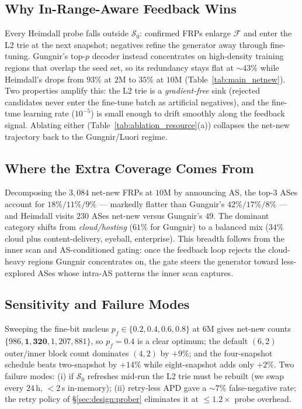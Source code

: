 \documentclass[conference]{IEEEtran}
\begin{document}
\subsection{Why In-Range-Aware Feedback Wins}
Every Heimdall probe falls outside $\mathcal{S}_{0}$: confirmed
FRPs enlarge $\mathcal{F}$ and enter the L2 trie at the next
snapshot; negatives refine the generator away through fine-tuning.
Gungnir's top-$p$ decoder instead concentrates on high-density
training regions that overlap the seed set, so its redundancy
stays flat at $\sim\!43\%$ while Heimdall's drops from $93\%$ at
$2$M to $35\%$ at $10$M (Table~\ref{tab:main_netnew}).  Two
properties amplify this: the L2 trie is a \emph{gradient-free}
sink (rejected candidates never enter the fine-tune batch as
artificial negatives), and the fine-tune learning rate
($10^{-5}$) is small enough to drift smoothly along the feedback
signal.  Ablating either (Table~\ref{tab:ablation_resource}(a))
collapses the net-new trajectory back to the Gungnir/Luori regime.

\subsection{Where the Extra Coverage Comes From}
Decomposing the $3{,}084$ net-new FRPs at $10$M by announcing AS,
the top-$3$ ASes account for $18\%/11\%/9\%$ --- markedly flatter
than Gungnir's $42\%/17\%/8\%$ --- and Heimdall visits $230$ ASes
net-new versus Gungnir's $49$.  The dominant category shifts
from \emph{cloud/hosting} ($61\%$ for Gungnir) to a balanced mix
($34\%$ cloud plus content-delivery, eyeball, enterprise).  This
breadth follows from the inner scan and AS-conditioned gating:
once the feedback loop rejects the cloud-heavy regions Gungnir
concentrates on, the gate steers the generator toward
less-explored ASes whose intra-AS patterns the inner scan captures.

\subsection{Sensitivity and Failure Modes}
Sweeping the fine-bit nucleus $p_f\!\in\!\{0.2,0.4,0.6,0.8\}$ at
$6$M gives net-new counts $\{986,\mathbf{1{,}320},1{,}207,881\}$,
so $p_f\!=\!0.4$ is a clear optimum; the default $(6,2)$ outer/inner
block count dominates $(4,2)$ by $+9\%$; and the four-snapshot
schedule beats two-snapshot by $+14\%$ while eight-snapshot adds
only $+2\%$.  Two failure modes: (i) if $\mathcal{S}_{0}$ refreshes
mid-run the L2 trie must be rebuilt (we swap every $24$\,h,
$<\!2$\,s in-memory); (ii) retry-less APD gave a $\sim\!7\%$
false-negative rate; the retry policy of \S\ref{sec:design:prober}
eliminates it at $\leq\!1.2\times$ probe overhead.
\end{document}
